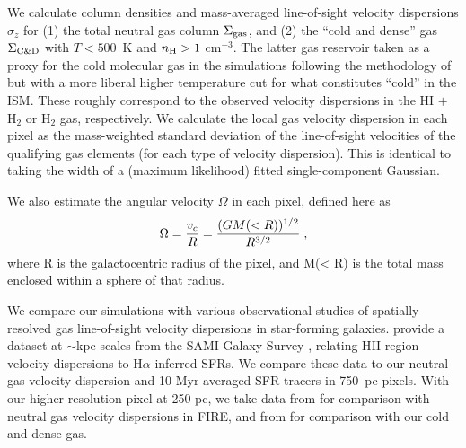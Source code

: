 \documentclass[usletter,fleqn,usenatbib]{mnras}
\begin{document}
We calculate column densities and mass-averaged line-of-sight velocity dispersions $\sigma_z$ for (1) the total neutral gas column $\Sigma_{\rm gas}$, and (2) the ``cold and dense'' gas $\Sigma_{\rm C\&D}$  with $T < 500$~K and $n_{\rm H} > 1$ cm$^{-3}$.  The latter gas reservoir taken as a proxy for the cold molecular gas in the simulations following the methodology of \citet{Orr2018} but with a more liberal higher temperature cut for what constitutes ``cold'' in the ISM.  These roughly correspond to the observed velocity dispersions in the H{\scriptsize I} $+$ H$_2$ or H$_2$ gas, respectively.  We calculate the local gas velocity dispersion in each pixel as the mass-weighted standard deviation of the line-of-sight velocities of the qualifying gas elements (for each type of velocity dispersion).  This is identical to taking the width of a (maximum likelihood) fitted single-component Gaussian.





We also estimate the angular velocity $\Omega$ in each pixel, defined here as
\begin{equation}\label{eqn:omega}
\begin{centering}
\Omega = \frac{v_c}{R} = \frac{(GM(<R))^{1/2}}{R^{3/2}} \; ,
\end{centering}
\end{equation}
where R is the galactocentric radius of the pixel, and M(< R) is the total mass enclosed within a sphere of that radius. 







We compare our simulations with various observational studies of spatially resolved gas line-of-sight velocity dispersions in star-forming galaxies. \citet{Zhou2017} provide a dataset at $\sim$kpc scales from the SAMI Galaxy Survey \citep{Croom2012, Scott2018}, relating H{\scriptsize II} region velocity dispersions to H$\alpha$-inferred SFRs.  We compare these data to our neutral gas velocity dispersion and 10 Myr-averaged SFR tracers in 750~pc pixels.  With our higher-resolution pixel at 250 pc, we take data from \citet[][H{\scriptsize II} region velocity dispersions]{Rozas2006} for comparison with neutral gas velocity dispersions in FIRE, and from \citet[][HCN-traced gas velocity dispersions and dense gas depletion times]{Querejeta2019} for comparison with our cold and dense gas.
\end{document}
